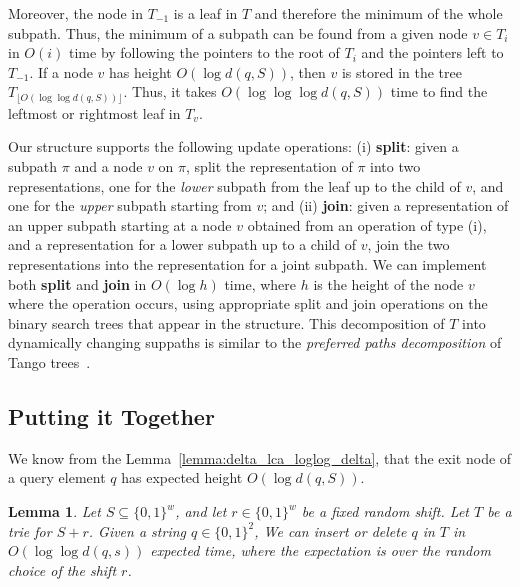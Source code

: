 \documentclass[a4paper,11pt]{article}
\newtheorem{lemma}[theorem]{Lemma}
\newcommand{\?}{\mskip1.5mu}
\begin{document}
Moreover, the node in $T_{-1}$ is a leaf 
in $T$ and therefore the minimum of the whole subpath. Thus, 
the minimum of a subpath can be found from a given node 
$v \in T_i$ in $O(i)$ time by following the
pointers to the root of $T_i$ and the pointers left to $T_{-1}$.
If a node $v$ has height $O(\log d(q, S))$, 
then $v$ is stored in
the tree $T_{\lfloor O(\log \log d(q, S)) \rfloor}$. Thus, it takes 
$O(\log \log \log d(q, S))$ time to find the leftmost
or rightmost leaf in $T_v$.

Our structure supports the following update operations:
(i) \textbf{split}: given a subpath $\pi$ and a node $v$ on $\pi$, split 
the representation of $\pi$ into two representations, one for the 
\emph{lower} subpath from the leaf up to the child of $v$, and
one for the \emph{upper} subpath starting from $v$; and (ii) 
\textbf{join}: given a
representation of an upper subpath starting at a node $v$ obtained 
from an operation of type (i), and a representation for 
a lower subpath up to a child of $v$, join the two representations
into the representation for a joint subpath.
We can implement
both \textbf{split} and \textbf{join} in
 $O(\log h)$ time, where $h$ is the height of 
the node $v$ where the operation occurs, using appropriate
split and join operations on the binary search trees that
appear in the structure. 
This decomposition of $T$ into dynamically changing suppaths
is similar to the \emph{preferred paths decomposition} of
Tango trees~\cite{DemaineHaIaPa07}.

\subsection{Putting it Together}

We know from the Lemma~\ref{lemma:delta_lca_loglog_delta}, that 
the exit node of a query element $q$ has expected 
height $O(\log d(q, S))$.

\begin{lemma}
\label{lemma:delta_insert}
Let $S \subseteq \{0, 1\}^w$, and let $r \in \{0, 1\}^w$ be
a fixed random shift. Let $T$ be
a trie for 
$S + r$.  Given a string $q \in \{0, 1\}^2$,
We can insert or delete $q$ in $T$
in $O(\log \log d(q, s))$ expected time, where the expectation is 
over the random choice of the shift $r$.
\end{lemma}
\end{document}
